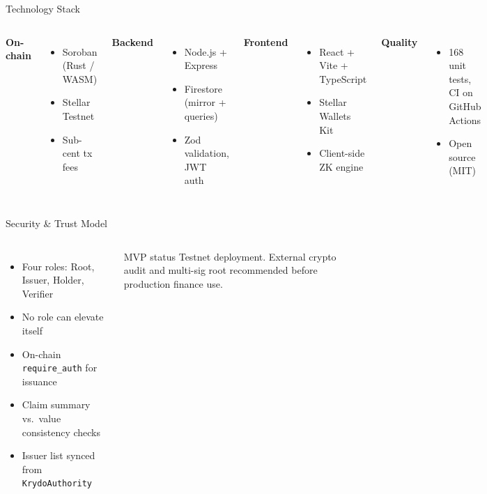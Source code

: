 \documentclass[aspectratio=169,11pt]{beamer}
\begin{document}
\begin{frame}{Technology Stack}
  \begin{columns}[T]
    \textbf{On-chain}
    \begin{itemize}
      \item Soroban (Rust / WASM)
      \item Stellar Testnet
      \item Sub-cent tx fees
    \end{itemize}
    \textbf{Backend}
    \begin{itemize}
      \item Node.js + Express
      \item Firestore (mirror + queries)
      \item Zod validation, JWT auth
    \end{itemize}
    \textbf{Frontend}
    \begin{itemize}
      \item React + Vite + TypeScript
      \item Stellar Wallets Kit
      \item Client-side ZK engine
    \end{itemize}
    \textbf{Quality}
    \begin{itemize}
      \item 168 unit tests, CI on GitHub Actions
      \item Open source (MIT)
    \end{itemize}
  \end{columns}
\end{frame}

\begin{frame}{Security \& Trust Model}
  \begin{columns}[T]
    \begin{itemize}
      \item Four roles: Root, Issuer, Holder, Verifier
      \item No role can elevate itself
      \item On-chain \texttt{require\_auth} for issuance
      \item Claim summary vs.\ value consistency checks
      \item Issuer list synced from \texttt{KrydoAuthority}
    \end{itemize}
    \begin{alertblock}{MVP status}
      Testnet deployment. External crypto audit and multi-sig root recommended before production finance use.
    \end{alertblock}
  \end{columns}
\end{frame}
\end{document}
